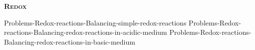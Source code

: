 \documentclass[main.tex]{subfiles}
\newcommand\chapterlabel{Ch-electrolytes}
\begin{document}
\begin{multicols*}{2}
{{\raggedright\textsc{\textbf{Redox}}\par}%
{Problems-Redox-reactions-Balancing-simple-redox-reactions}%
{Problems-Redox-reactions-Balancing-redox-reactions-in-acidic-medium}%
{Problems-Redox-reactions-Balancing-redox-reactions-in-basic-medium}%
}







\end{multicols*} \checkoddpage\ifoddpage \clearpage\thispagestyle{empty}\mbox{}\clearpage \else  \fi
{}\iftoggle{showfinalanswers}{
\begin{answerbox}
\begin{answersenvironment}
 \begin{localsize}{10}
{\Large \bf Answers}
\SetupExSheets{ headings = inline-nr , counter-format = qu) ,}
\printsolutions 
  \vspace{20cm}
 \end{localsize}
 \end{answersenvironment}
\end{answerbox}
}{}
\checkoddpage\ifoddpage \clearpage\thispagestyle{empty}\mbox{}\clearpage \else  \fi
\end{document}
